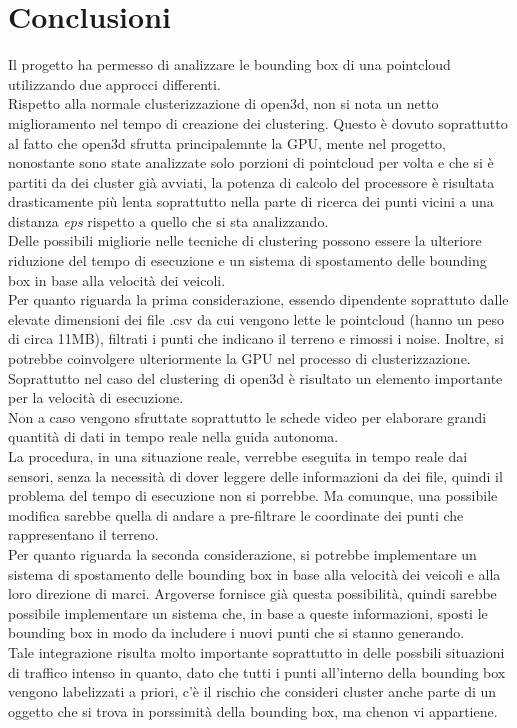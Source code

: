 \documentclass[italian]{article}
\begin{document}
\section*{Conclusioni}
Il progetto ha permesso di analizzare le bounding box di una pointcloud utilizzando due approcci differenti.\\
Rispetto alla normale clusterizzazione di open3d, non si nota un netto miglioramento nel tempo di creazione dei clustering. Questo è dovuto soprattutto al fatto che open3d sfrutta principalemnte la GPU, mente nel progetto, nonostante sono state analizzate solo porzioni di pointcloud per volta e che si è partiti da dei cluster già avviati, la potenza di calcolo del processore è risultata drasticamente più lenta soprattutto nella parte di ricerca dei punti vicini a una distanza \textit{eps} rispetto a quello che si sta analizzando.\\
Delle possibili migliorie nelle tecniche di clustering possono essere la ulteriore riduzione del tempo di esecuzione e un sistema di spostamento delle bounding box in base alla velocità dei veicoli.\\
Per quanto riguarda la prima considerazione, essendo dipendente soprattuto dalle elevate dimensioni dei file .csv da cui vengono lette le pointcloud (hanno un peso di circa 11MB), filtrati i punti che indicano il terreno e rimossi i noise. Inoltre, si potrebbe coinvolgere ulteriormente la GPU nel processo di clusterizzazione. Soprattutto nel caso del clustering di open3d è risultato un elemento importante per la velocità di esecuzione.\\
Non a caso vengono sfruttate soprattutto le schede video per elaborare grandi quantità di dati in tempo reale nella guida autonoma.\\
La procedura, in una situazione reale, verrebbe eseguita in tempo reale dai sensori, senza la necessità di dover leggere delle informazioni da dei file, quindi il problema del tempo di esecuzione non si porrebbe. Ma comunque, una possibile modifica sarebbe quella di andare a pre-filtrare le coordinate dei punti che rappresentano il terreno.\\
Per quanto riguarda la seconda considerazione, si potrebbe implementare un sistema di spostamento delle bounding box in base alla velocità dei veicoli e alla loro direzione di marci. Argoverse fornisce già questa possibilità, quindi sarebbe possibile implementare un sistema che, in base a queste informazioni, sposti le bounding box in modo da includere i nuovi punti che si stanno generando.\\
Tale integrazione risulta molto importante soprattutto in delle possbili situazioni di traffico intenso in quanto, dato che tutti i punti all'interno della bounding box vengono labelizzati a priori, c'è il rischio che consideri cluster anche parte di un oggetto che si trova in porssimità della bounding box, ma chenon vi appartiene.\\
\end{document}
